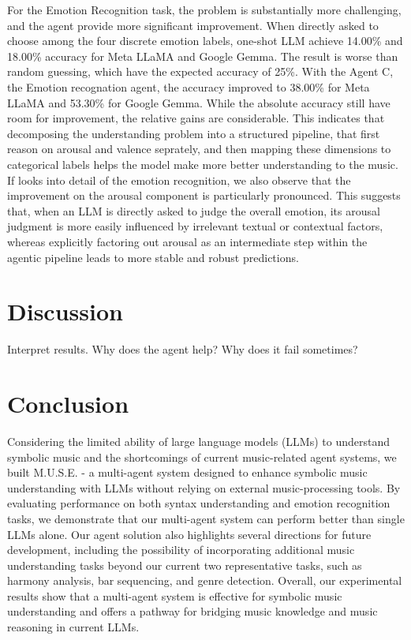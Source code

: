 \documentclass[sigconf]{acmart}
\begin{document}
For the Emotion Recognition task, the problem is substantially more challenging, and the agent provide more significant improvement. When directly asked to choose among the four discrete emotion labels, one-shot LLM achieve 14.00\% and 18.00\% accuracy for Meta LLaMA and Google Gemma. The result is worse than random guessing, which have the expected accuracy of 25\%. With the Agent C, the Emotion recognation agent, the accuracy improved to 38.00\% for Meta LLaMA and 53.30\% for Google Gemma. While the absolute accuracy still have room for improvement, the relative gains are considerable. This indicates that decomposing the understanding problem into a structured pipeline, that first reason on arousal and valence seprately, and then mapping these dimensions to categorical labels helps the model make more better understanding to the music. If looks into detail of the emotion recognition, we also observe that the improvement on the arousal component is particularly pronounced. This suggests that, when an LLM is directly asked to judge the overall emotion, its arousal judgment is more easily influenced by irrelevant textual or contextual factors, whereas explicitly factoring out arousal as an intermediate step within the agentic pipeline leads to more stable and robust predictions.

 





\section{Discussion}
Interpret results. Why does the agent help? Why does it fail sometimes?


\section{Conclusion}
Considering the limited ability of large language models (LLMs) to understand symbolic music and the shortcomings of current music-related agent systems, we built M.U.S.E. - a multi-agent system designed to enhance symbolic music understanding with LLMs without relying on external music-processing tools. By evaluating performance on both syntax understanding and emotion recognition tasks, we demonstrate that our multi-agent system can perform better than single LLMs alone.  Our agent solution also highlights several directions for future development, including the possibility of incorporating additional music understanding tasks beyond our current two representative tasks, such as harmony analysis, bar sequencing, and genre detection. Overall, our experimental results show that a multi-agent system is effective for symbolic music understanding and offers a pathway for bridging music knowledge and music reasoning in current LLMs.
\end{document}
